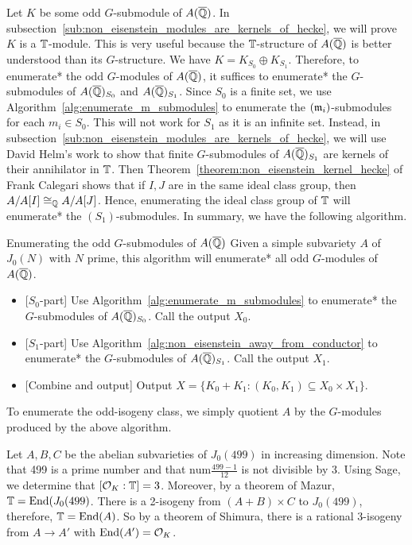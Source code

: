 \documentclass{article}
\begin{document}
Let $K$ be some odd $G$-submodule of $A(\overline{\mathbb{Q}})$. In
subsection~\ref{sub:non_eisenstein_modules_are_kernels_of_hecke}, we will prove
$K$ is a $\mathbb{T}$-module. This is very useful because the $\mathbb{T}$-structure of
$A(\overline{\mathbb{Q}})$ is better understood than its $G$-structure. We have
$K=K_{S_0}\oplus K_{S_1}$. Therefore, to enumerate* the odd $G$-modules of
$A(\overline{\mathbb{Q}})$, it suffices to enumerate* the $G$-submodules of $A(\overline{\mathbb{Q}})_{S_0}$ and
$A(\overline{\mathbb{Q}})_{S_1}$. Since $S_0$ is a finite set, we use
Algorithm~\ref{alg:enumerate_m_submodules} to enumerate the $(\mathfrak{m}_i)$-submodules for
each $m_i\in S_0$. This will not work for $S_1$ as it is an infinite set.
Instead, in subsection~\ref{sub:non_eisenstein_modules_are_kernels_of_hecke},
we will use David Helm's work to show that finite $G$-submodules of
$A(\overline{\mathbb{Q}})_{S_1}$ are kernels of their annihilator in $\mathbb{T}$. Then
Theorem~\ref{theorem:non_eisenstein_kernel_hecke} of Frank Calegari shows that
if $I,J$ are in the same ideal class group, then $A/A[I]\cong_{\mathbb{Q}} A/A[J]$.
Hence, enumerating the ideal class group of $\mathbb{T}$ will enumerate* the
$(S_1)$-submodules. In summary, we have the following algorithm.
\begin{algorithm}{Enumerating the odd $G$-submodules of $A(\overline{\mathbb{Q}})$}
    Given a simple subvariety $A$ of $J_0(N)$ with $N$ prime, this algorithm
    will enumerate* all odd $G$-modules of $A(\overline{\mathbb{Q}})$. 
    \begin{itemize}
        \item{} [$S_0$-part]
            Use Algorithm~\ref{alg:enumerate_m_submodules} to enumerate* the
            $G$-submodules of $A(\overline{\mathbb{Q}})_{S_0}$. Call the output $X_0$.
        \item{} [$S_1$-part]
            Use Algorithm~\ref{alg:non_eisenstein_away_from_conductor} to
            enumerate* the $G$-submodules of $A(\overline{\mathbb{Q}})_{S_1}$. Call the output
            $X_1$.
        \item{}\label{item:combine} [Combine and output]
            Output $X=\{K_0+K_1:(K_0,K_1)\subseteq X_0\times X_1\}$.
    \end{itemize}
\end{algorithm}
To enumerate the odd-isogeny class, we simply quotient $A$ by the $G$-modules
produced by the above algorithm.

\begin{example}
    Let $A,B,C$ be the abelian subvarieties of $J_0(499)$ in increasing
    dimension. Note that 499 is a prime number and that
    $\mathrm{num}\frac{499-1}{12}$ is not divisible by 3. Using Sage, we
    determine that $[\mathcal{O}_K:\mathbb{T}]=3$. Moreover, by a theorem of Mazur,
    $\mathbb{T}=\operatorname{End}(J_0(499)$. There is a 2-isogeny from $(A+B)\times C$ to
    $J_0(499)$, therefore, $\mathbb{T}=\operatorname{End}(A)$. So by a theorem of Shimura, there is
    a rational 3-isogeny from $A\to A'$ with $\operatorname{End}(A')=\mathcal{O}_K$.
\end{example}
\end{document}
